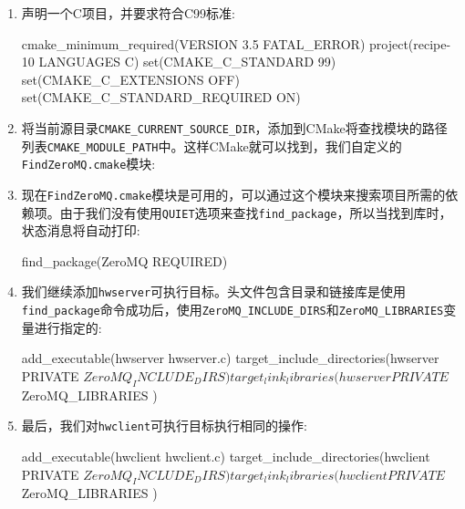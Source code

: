 \begin{enumerate}
\item 声明一个C项目，并要求符合C99标准:

\begin{codebox}[cmake]
cmake_minimum_required(VERSION 3.5 FATAL_ERROR)
project(recipe-10 LANGUAGES C)
set(CMAKE_C_STANDARD 99)
set(CMAKE_C_EXTENSIONS OFF)
set(CMAKE_C_STANDARD_REQUIRED ON)
\end{codebox}

\item 将当前源目录\texttt{CMAKE\_CURRENT\_SOURCE\_DIR}，添加到CMake将查找模块的路径列表\texttt{CMAKE\_MODULE\_PATH}中。这样CMake就可以找到，我们自定义的\texttt{FindZeroMQ.cmake}模块:


\item 现在\texttt{FindZeroMQ.cmake}模块是可用的，可以通过这个模块来搜索项目所需的依赖项。由于我们没有使用\texttt{QUIET}选项来查找\texttt{find\_package}，所以当找到库时，状态消息将自动打印:

\begin{codebox}[cmake]
find_package(ZeroMQ REQUIRED)
\end{codebox}

\item 我们继续添加\texttt{hwserver}可执行目标。头文件包含目录和链接库是使用\texttt{find\_package}命令成功后，使用\texttt{ZeroMQ\_INCLUDE\_DIRS}和\texttt{ZeroMQ\_LIBRARIES}变量进行指定的:

\begin{codebox}[cmake]
add_executable(hwserver hwserver.c)
target_include_directories(hwserver
  PRIVATE
    ${ZeroMQ_INCLUDE_DIRS}
  )
target_link_libraries(hwserver
  PRIVATE
    ${ZeroMQ_LIBRARIES}
  )
\end{codebox}

\item 最后，我们对\texttt{hwclient}可执行目标执行相同的操作:

\begin{codebox}[cmake]
add_executable(hwclient hwclient.c)
target_include_directories(hwclient
  PRIVATE
    ${ZeroMQ_INCLUDE_DIRS}
  )
target_link_libraries(hwclient
  PRIVATE
    ${ZeroMQ_LIBRARIES}
  )
\end{codebox}

\end{enumerate}

